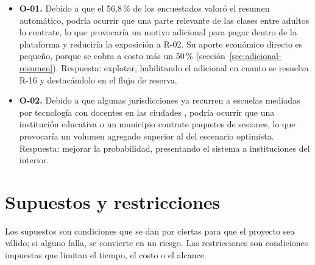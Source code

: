 \begin{itemize}
    \item \textbf{O-01.} Debido a que el 56,8\,\% de los encuestados
          valoró el resumen automático, podría ocurrir que una parte
          relevante de las clases entre adultos lo contrate, lo que
          provocaría un motivo adicional para pagar dentro de la
          plataforma y reduciría la exposición a R-02. Su aporte económico
          directo es pequeño, porque se cobra a costo más un 50\,\%
          (sección~\ref{sec:adicional-resumen}). Respuesta: explotar,
          habilitando el adicional en cuanto se resuelva R-16 y
          destacándolo en el flujo de reserva.
    \item \textbf{O-02.} Debido a que algunas jurisdicciones ya recurren a
          escuelas mediadas por tecnología con docentes en las ciudades
          \citep{olea}, podría ocurrir que una institución educativa o un
          municipio contrate paquetes de sesiones, lo que provocaría un
          volumen agregado superior al del escenario optimista. Respuesta:
          mejorar la probabilidad, presentando el sistema a instituciones
          del interior.
\end{itemize}

\section{Supuestos y restricciones}\label{sec:supuestos}

Los supuestos son condiciones que se dan por ciertas para que el
proyecto sea válido; si alguno falla, se convierte en un riesgo. Las
restricciones son condiciones impuestas que limitan el tiempo, el costo o
el alcance.

